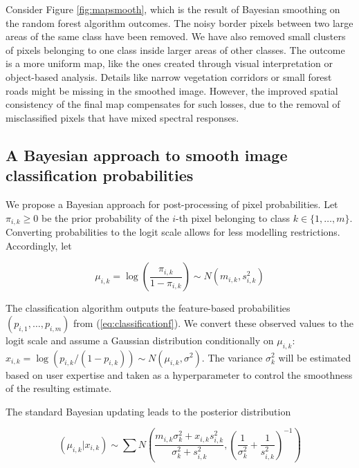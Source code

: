 \documentclass[
  shortnames]{jss}
\begin{document}
Consider Figure \ref{fig:mapsmooth}, which is the result of Bayesian smoothing on the random forest algorithm outcomes. The noisy border pixels between two large areas of the same class have been removed. We have also removed small clusters of pixels belonging to one class inside larger areas of other classes. The outcome is a more uniform map, like the ones created through visual interpretation or object-based analysis. Details like narrow vegetation corridors or small forest roads might be missing in the smoothed image. However, the improved spatial consistency of the final map compensates for such losses, due to the removal of misclassified pixels that have mixed spectral responses.

\hypertarget{a-bayesian-approach-to-smooth-image-classification-probabilities}{%
\subsection{A Bayesian approach to smooth image classification probabilities}\label{a-bayesian-approach-to-smooth-image-classification-probabilities}}

We propose a Bayesian approach for post-processing of pixel probabilities. Let \(\pi_{i,k} \geq 0\) be the prior probability of the \(i\)-th pixel belonging to class \(k \in \{1, \ldots, m\}\). Converting probabilities to the logit scale allows for less modelling restrictions. Accordingly, let

\begin{equation} 
\mu_{i,k} = \log\left( \frac{\pi_{i,k}}{1-\pi_{i,k}} \right) \sim N(m_{i,k}, s^2_{i,k}) 
\end{equation}

The classification algorithm outputs the feature-based probabilities \((p_{i,1}, \ldots, p_{i,m})\) from (\ref{eq:classificationf}). We convert these observed values to the logit
scale and assume a Gaussian distribution conditionally on \(\mu_{i,k}\):
\(x_{i,k} = \log(p_{i,k}/(1-p_{i,k})) \sim N(\mu_{i,k}, \sigma^2)\).
The variance \(\sigma^2_{k}\) will be estimated based on user expertise and taken as a hyperparameter to control the smoothness of the resulting estimate.

The standard Bayesian updating \citep{Gelman2014} leads to the posterior distribution

\begin{equation}
(\mu_{i,k} | x_{i,k}) \sim \sum N\left(  \frac{m_{i,k} \sigma^2_{k} +
    x_{i,k} s^2_{i,k}}{ \sigma^2_{k} +s^2_{i,k}} , \left( \frac{1}{\sigma_k^2} + \frac{1}{s^2_{i,k}} \right)^{-1} \right) 
\label{eq:BayesUpdate}
\end{equation}
\end{document}
